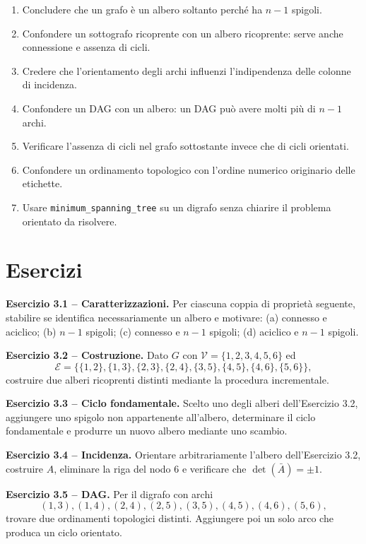 \documentclass[11pt,a4paper]{article}
\newcommand{\V}{\mathcal{V}}
\newcommand{\E}{\mathcal{E}}
\begin{document}
\begin{enumerate}
\item Concludere che un grafo è un albero soltanto perché ha $n-1$ spigoli.
\item Confondere un sottografo ricoprente con un albero ricoprente: serve anche connessione e assenza di cicli.
\item Credere che l'orientamento degli archi influenzi l'indipendenza delle colonne di incidenza.
\item Confondere un DAG con un albero: un DAG può avere molti più di $n-1$ archi.
\item Verificare l'assenza di cicli nel grafo sottostante invece che di cicli orientati.
\item Confondere un ordinamento topologico con l'ordine numerico originario delle etichette.
\item Usare \texttt{minimum\_spanning\_tree} su un digrafo senza chiarire il problema orientato da risolvere.
\end{enumerate}

\section{Esercizi}

\textbf{Esercizio 3.1 -- Caratterizzazioni.}
Per ciascuna coppia di proprietà seguente, stabilire se identifica necessariamente un albero e motivare: (a) connesso e aciclico; (b) $n-1$ spigoli; (c) connesso e $n-1$ spigoli; (d) aciclico e $n-1$ spigoli.

\medskip
\textbf{Esercizio 3.2 -- Costruzione.}
Dato $G$ con $\V=\{1,2,3,4,5,6\}$ ed
\[
\E=\{\{1,2\},\{1,3\},\{2,3\},\{2,4\},\{3,5\},\{4,5\},\{4,6\},\{5,6\}\},
\]
costruire due alberi ricoprenti distinti mediante la procedura incrementale.

\medskip
\textbf{Esercizio 3.3 -- Ciclo fondamentale.}
Scelto uno degli alberi dell'Esercizio 3.2, aggiungere uno spigolo non appartenente all'albero, determinare il ciclo fondamentale e produrre un nuovo albero mediante uno scambio.

\medskip
\textbf{Esercizio 3.4 -- Incidenza.}
Orientare arbitrariamente l'albero dell'Esercizio 3.2, costruire $A$, eliminare la riga del nodo 6 e verificare che $\det(\bar A)=\pm1$.

\medskip
\textbf{Esercizio 3.5 -- DAG.}
Per il digrafo con archi
\[
(1,3),(1,4),(2,4),(2,5),(3,5),(4,5),(4,6),(5,6),
\]
trovare due ordinamenti topologici distinti. Aggiungere poi un solo arco che produca un ciclo orientato.
\end{document}
